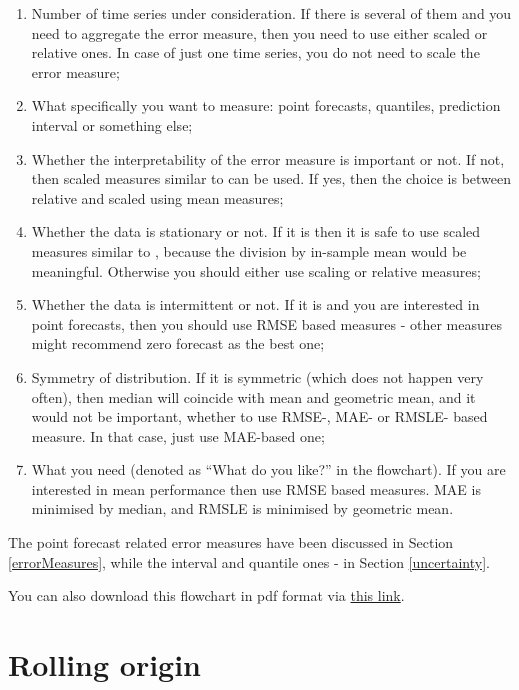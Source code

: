 \documentclass[
]{book}
\providecommand{\tightlist}{%
  \setlength{\itemsep}{0pt}\setlength{\parskip}{0pt}}
\theoremstyle{definition}
\theoremstyle{definition}
\theoremstyle{definition}
\theoremstyle{definition}
\theoremstyle{remark}
\begin{document}
\begin{enumerate}
\def\labelenumi{\arabic{enumi}.}
\tightlist
\item
  Number of time series under consideration. If there is several of them and you need to aggregate the error measure, then you need to use either scaled or relative ones. In case of just one time series, you do not need to scale the error measure;
\item
  What specifically you want to measure: point forecasts, quantiles, prediction interval or something else;
\item
  Whether the interpretability of the error measure is important or not. If not, then scaled measures similar to \citet{Hyndman2006} can be used. If yes, then the choice is between relative and scaled using mean measures;
\item
  Whether the data is stationary or not. If it is then it is safe to use scaled measures similar to \citet{Petropoulos2015}, because the division by in-sample mean would be meaningful. Otherwise you should either use \citet{Hyndman2006} scaling or relative measures;
\item
  Whether the data is intermittent or not. If it is and you are interested in point forecasts, then you should use RMSE based measures - other measures might recommend zero forecast as the best one;
\item
  Symmetry of distribution. If it is symmetric (which does not happen very often), then median will coincide with mean and geometric mean, and it would not be important, whether to use RMSE-, MAE- or RMSLE- based measure. In that case, just use MAE-based one;
\item
  What you need (denoted as ``What do you like?'' in the flowchart). If you are interested in mean performance then use RMSE based measures. MAE is minimised by median, and RMSLE is minimised by geometric mean.
\end{enumerate}

The point forecast related error measures have been discussed in Section \ref{errorMeasures}, while the interval and quantile ones - in Section \ref{uncertainty}.

You can also download this flowchart in pdf format via \href{./images/errorMeasuresFlowChart-v2.pdf}{this link}.

\hypertarget{rollingOrigin}{%
\section{Rolling origin}\label{rollingOrigin}}
\end{document}
